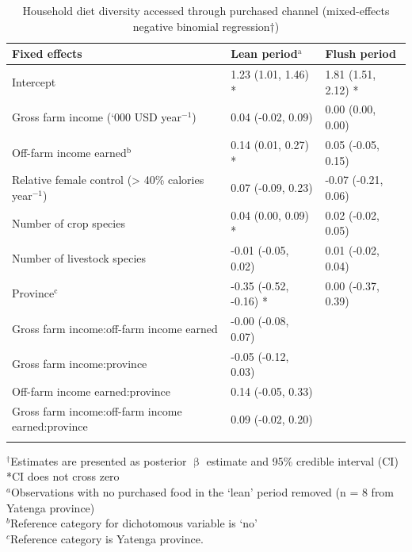 \begin{table}[H]
  \captionsetup{singlelinecheck = false, justification=justified}
  \caption{Household diet diversity accessed through purchased channel (mixed-effects negative binomial regression${\dag}$)}
  \label{tab:05_7}
  \small
\begin{tabularx}{\textwidth}{@{}lYY@{}}
\toprule
 Fixed effects & Lean period$^{\mathrm{a}}$ & Flush period \\
 \midrule
Intercept & 1.23 (1.01, 1.46) * & 1.81 (1.51, 2.12) * \\
Gross farm income (`000 USD year$^{-1}$) & 0.04 (-0.02, 0.09) & 0.00 (0.00, 0.00) \\
Off-farm income earned$^{\mathrm{b}}$ & 0.14 (0.01, 0.27) * & 0.05 (-0.05, 0.15) \\
Relative female control ({\textgreater} 40\% calories year$^{-1}$) & 0.07 (-0.09, 0.23) & -0.07 (-0.21, 0.06) \\
Number of crop species & 0.04 (0.00, 0.09) * & 0.02 (-0.02, 0.05) \\
Number of livestock species & -0.01 (-0.05, 0.02) & 0.01 (-0.02, 0.04) \\
Province$^{\mathrm{c}}$ & -0.35 (-0.52, -0.16) * & 0.00 (-0.37, 0.39) \\
\midrule
Gross farm income:off-farm income earned & -0.00 (-0.08, 0.07) & \\
Gross farm income:province & -0.05 (-0.12, 0.03) & \\
Off-farm income earned:province & 0.14 (-0.05, 0.33) & \\
Gross farm income:off-farm income earned:province & 0.09 (-0.02, 0.20) & \\
\bottomrule
\end{tabularx}
\footnotesize
\raggedright
$^{\dag}$Estimates are presented as posterior ${\upbeta}$ estimate and 95\% credible interval (CI)\\
*CI does not cross zero\\
$^a$Observations with no purchased food in the `lean' period removed (n = 8 from Yatenga province)\\
$^b$Reference category for dichotomous variable is `no'\\
$^c$Reference category is Yatenga province.\\%
\end{table}



